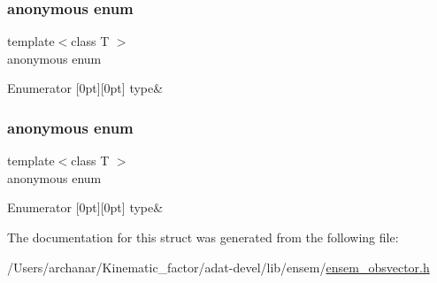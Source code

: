 \subsubsection{\texorpdfstring{anonymous enum}{anonymous enum}}
{\footnotesize\ttfamily template$<$class T $>$ \\
anonymous enum}

\begin{DoxyEnumFields}{Enumerator}
[0pt][0pt]{}\mbox{\label{structENSEM_1_1EnsbcIO_3_01OVector_3_01T_01_4_01_4_aec51a8b8d57f021bc8e72faea03f84f5a5ec4910ef487633a25ec3ae40769fa45}} 
type&\\
\hline

\end{DoxyEnumFields}
\mbox{\label{structENSEM_1_1EnsbcIO_3_01OVector_3_01T_01_4_01_4_aec51a8b8d57f021bc8e72faea03f84f5}} 
\subsubsection{\texorpdfstring{anonymous enum}{anonymous enum}}
{\footnotesize\ttfamily template$<$class T $>$ \\
anonymous enum}

\begin{DoxyEnumFields}{Enumerator}
[0pt][0pt]{}\mbox{\label{structENSEM_1_1EnsbcIO_3_01OVector_3_01T_01_4_01_4_aec51a8b8d57f021bc8e72faea03f84f5a5ec4910ef487633a25ec3ae40769fa45}} 
type&\\
\hline

\end{DoxyEnumFields}


The documentation for this struct was generated from the following file\+:\begin{DoxyCompactItemize}
\item 
/\+Users/archanar/\+Kinematic\+\_\+factor/adat-\/devel/lib/ensem/\mbox{\hyperlink{adat-devel_2lib_2ensem_2ensem__obsvector_8h}{ensem\+\_\+obsvector.\+h}}\end{DoxyCompactItemize}
